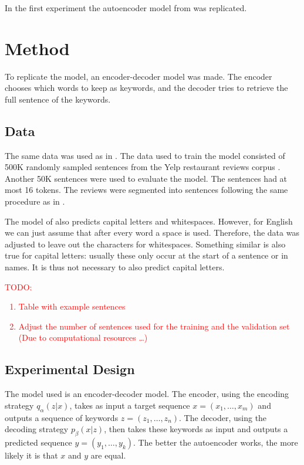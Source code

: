 In the first experiment the autoencoder model from  was replicated. 

\section{Method}
To replicate the model, an encoder-decoder model was made. The encoder chooses which words to keep as keywords, and the decoder tries to retrieve the full sentence of the keywords. 

\subsection{Data}
\label{sec:data}
The same data was used as in .
The data used to train the model consisted of 500K randomly sampled sentences from the Yelp restaurant reviews corpus .
Another 50K sentences were used to evaluate the model. 
The sentences had at most 16 tokens. 
The reviews were segmented into sentences following the same procedure as in . 

The model of  also predicts capital letters and whitespaces. 
However, for English we can just assume that after every word a space is used. 
Therefore, the data was adjusted to leave out the characters for whitespaces. 
Something similar is also true for capital letters: usually these only occur at the start of a sentence or in names. 
It is thus not necessary to also predict capital letters. 

\noindent\textcolor{red}{TODO: \begin{enumerate}
    \item Table with example sentences
    \item Adjust the number of sentences used for the training and the validation set (Due to computational resources \dots)
\end{enumerate}}

\subsection{Experimental Design}
The model used is an encoder-decoder model.
The encoder, using the encoding strategy $q_{\alpha}(z|x)$, takes as input a target sequence $x = (x_1, \dots, x_m)$ and outputs a sequence of keywords $z = (z_1, \dots, z_n)$.
The decoder, using the decoding strategy $p_{\beta}(x|z)$, then takes these keywords as input and outputs a predicted sequence $y = (y_1, \dots, y_k)$. 
The better the autoencoder works, the more likely it is that $x$ and $y$ are equal. 

